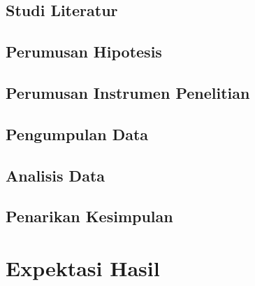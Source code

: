\documentclass{article}
\begin{document}
\subsection{Studi Literatur}
\subsection{Perumusan Hipotesis}
\subsection{Perumusan Instrumen Penelitian}
\subsection{Pengumpulan Data}
\subsection{Analisis Data}
\subsection{Penarikan Kesimpulan}
\newpage


\section{Expektasi Hasil}
\end{document}
